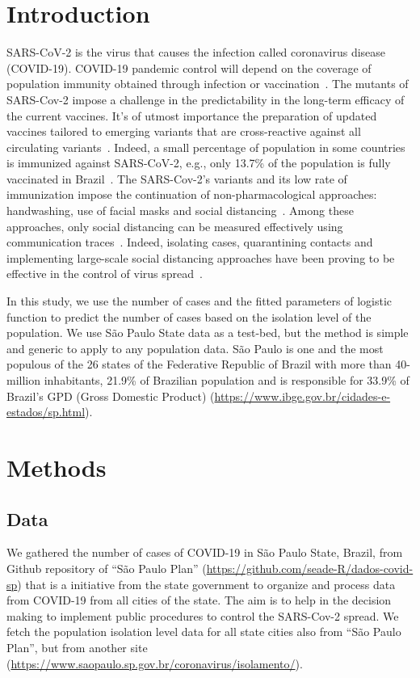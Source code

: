 \documentclass[review]{elsarticle}
\begin{document}
\linenumbers

\section{Introduction}

SARS-CoV-2 is the virus that causes the infection called coronavirus disease (COVID-19). 
COVID-19 pandemic control will depend on the coverage of population immunity obtained 
through infection or vaccination~\cite{WHOa}. The mutants of SARS-Cov-2 impose a challenge in 
the predictability in the long-term efficacy of the current vaccines. 
 It’s of utmost importance the preparation of updated vaccines tailored 
to emerging variants that are cross-reactive against all circulating variants~\cite{Harvey2021}. 
Indeed, a small percentage of population in some countries is immunized against SARS-CoV-2, 
e.g., only 13.7\% of the population is fully vaccinated in Brazil~\cite{MH2021}.
The SARS-Cov-2’s variants and its low rate of immunization impose the continuation of 
non-pharmacological approaches: handwashing, use of facial masks and social distancing~\cite{WHOb}. 
Among these approaches, only social distancing can be measured effectively using 
communication traces~\cite{Farrahi2014}. 
Indeed, isolating cases, quarantining contacts and implementing
large-scale social distancing approaches have been proving to 
be effective in the control of virus spread~\cite{Aquino2020}.

In this study, we use the number of cases and the fitted parameters of logistic function 
to predict the number of cases based on the isolation level of the population. 
We use São Paulo State data as a test-bed, but the method is simple and generic 
to apply to any population data. 
São Paulo is one and the most populous of the 26 states 
of the Federative Republic of Brazil with 
more than 40-million inhabitants, 21.9\% 
of Brazilian population and is responsible for 33.9\% 
of Brazil’s GPD (Gross Domestic Product) (\url{https://www.ibge.gov.br/cidades-e-estados/sp.html}).

\section{Methods}

\subsection{Data}

We gathered the number of cases of COVID-19 in São Paulo State, Brazil, from Github 
repository of ``São Paulo Plan'' (\url{https://github.com/seade-R/dados-covid-sp}) 
that is a initiative from the state government to organize and process data from COVID-19 
from all cities of the state. The aim is to help in the decision making to implement public 
procedures to control the SARS-Cov-2 spread. We fetch the population isolation level data 
for all state cities also from 
``São Paulo Plan'', but from another site (\url{https://www.saopaulo.sp.gov.br/coronavirus/isolamento/}).
\end{document}
